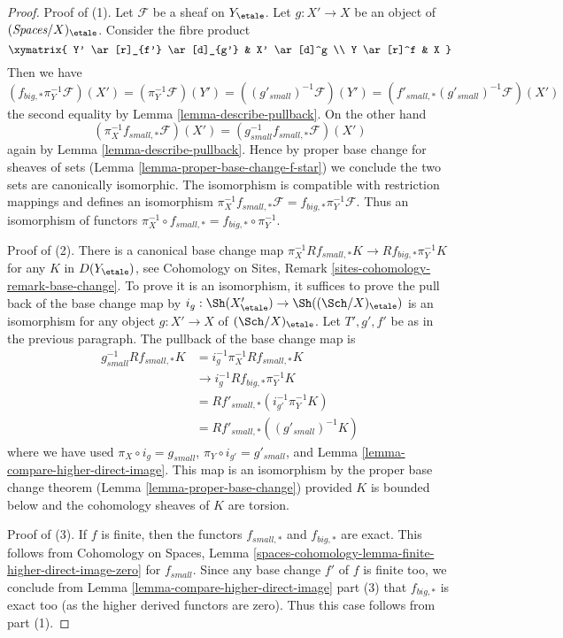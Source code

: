 \begin{proof}
Proof of (1). Let $\mathcal{F}$ be a sheaf on $Y_\etale$.
Let $g : X' \to X$ be an object of $(\textit{Spaces}/X)_\etale$.
Consider the fibre product
$$
\xymatrix{
Y' \ar[r]_{f'} \ar[d]_{g'} & X' \ar[d]^g \\
Y \ar[r]^f & X
}
$$
Then we have
$$
(f_{big, *}\pi_Y^{-1}\mathcal{F})(X') =
(\pi_Y^{-1}\mathcal{F})(Y') =
((g'_{small})^{-1}\mathcal{F})(Y')  =
(f'_{small, *}(g'_{small})^{-1}\mathcal{F})(X')
$$
the second equality by Lemma \ref{lemma-describe-pullback}.
On the other hand
$$
(\pi_X^{-1}f_{small, *}\mathcal{F})(X') =
(g_{small}^{-1}f_{small, *}\mathcal{F})(X')
$$
again by Lemma \ref{lemma-describe-pullback}.
Hence by proper base change for sheaves of sets
(Lemma \ref{lemma-proper-base-change-f-star})
we conclude the two sets are canonically isomorphic.
The isomorphism is compatible with restriction mappings
and defines an isomorphism
$\pi_X^{-1}f_{small, *}\mathcal{F} = f_{big, *}\pi_Y^{-1}\mathcal{F}$.
Thus an isomorphism of functors
$\pi_X^{-1} \circ f_{small, *} = f_{big, *} \circ \pi_Y^{-1}$.

\medskip\noindent
Proof of (2). There is a canonical base change map
$\pi_X^{-1}Rf_{small, *}K \to Rf_{big, *}\pi_Y^{-1}K$
for any $K$ in $D(Y_\etale)$, see
Cohomology on Sites, Remark \ref{sites-cohomology-remark-base-change}.
To prove it is an isomorphism, it suffices to prove the pull back of
the base change map by $i_g : \Sh(X'_\etale) \to \Sh((\Sch/X)_\etale)$
is an isomorphism for any object $g : X' \to X$ of $(\Sch/X)_\etale$.
Let $T', g', f'$ be as in the previous paragraph.
The pullback of the base change map is
\begin{align*}
g_{small}^{-1}Rf_{small, *}K
& =
i_g^{-1}\pi_X^{-1}Rf_{small, *}K \\
& \to
i_g^{-1}Rf_{big, *}\pi_Y^{-1}K \\
& =
Rf'_{small, *}(i_{g'}^{-1}\pi_Y^{-1}K) \\
& =
Rf'_{small, *}((g'_{small})^{-1}K)
\end{align*}
where we have used $\pi_X \circ i_g = g_{small}$,
$\pi_Y \circ i_{g'} = g'_{small}$, and
Lemma \ref{lemma-compare-higher-direct-image}.
This map is an isomorphism by the proper base change theorem
(Lemma \ref{lemma-proper-base-change}) provided $K$ is bounded
below and the cohomology sheaves of $K$ are torsion.

\medskip\noindent
Proof of (3). If $f$ is finite, then the functors
$f_{small, *}$ and $f_{big, *}$ are exact. This follows
from Cohomology on Spaces, Lemma
\ref{spaces-cohomology-lemma-finite-higher-direct-image-zero}
for $f_{small}$. Since any base change $f'$ of $f$ is finite too,
we conclude from Lemma \ref{lemma-compare-higher-direct-image} part (3)
that $f_{big, *}$ is exact too (as the higher derived functors are zero).
Thus this case follows from part (1).
\end{proof}







